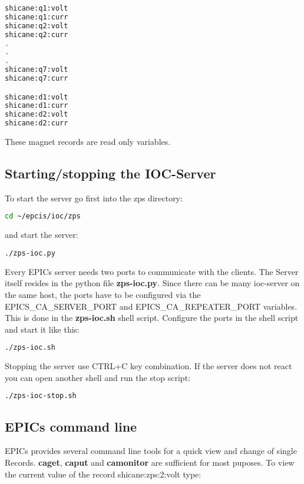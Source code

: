 \begin{lstlisting}[language=bash]
shicane:q1:volt
shicane:q1:curr
shicane:q2:volt
shicane:q2:curr
.
.
.
shicane:q7:volt
shicane:q7:curr

shicane:d1:volt
shicane:d1:curr
shicane:d2:volt
shicane:d2:curr
\end{lstlisting}

These magnet records are read only variables.

\subsection*{Starting/stopping the IOC-Server}

To start the server go first into the zps directory: 

\begin{lstlisting}[language=bash]
cd ~/epcis/ioc/zps
\end{lstlisting}

and start the server:

\begin{lstlisting}[language=bash]
./zps-ioc.py
\end{lstlisting}

Every EPICs server needs two ports to communicate with the clients. The Server itself resides in the python file \textbf{zps-ioc.py}. Since there can be many ioc-server on the same host, the ports have to be configured via the EPICS\_CA\_SERVER\_PORT and EPICS\_CA\_REPEATER\_PORT variables. This is done in the \textbf{zps-ioc.sh} shell script. Configure the ports in the shell script and start it like this:

\begin{lstlisting}[language=bash]
./zps-ioc.sh
\end{lstlisting}

Stopping the server use CTRL+C key combination. If the server does not react you can open another shell and run the stop script:

\begin{lstlisting}[language=bash]
./zps-ioc-stop.sh
\end{lstlisting}



\subsection*{EPICs command line}

EPICs provides several command line tools for a quick view and change of single Records. \textbf{caget}, \textbf{caput} and \textbf{camonitor} are sufficient for most puposes. To view the current value of the record shicane:zps:2:volt type:

